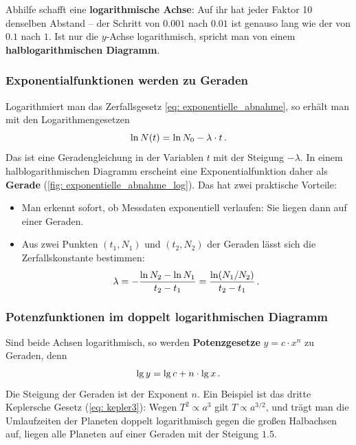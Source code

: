 Abhilfe schafft eine \textbf{logarithmische Achse}: Auf ihr hat jeder Faktor 10 denselben Abstand -- der Schritt von $\num{0.001}$ nach $\num{0.01}$ ist genauso lang wie der von $\num{0.1}$ nach $1$. Ist nur die $y$-Achse logarithmisch, spricht man von einem \textbf{halblogarithmischen Diagramm}.

\subsubsection*{Exponentialfunktionen werden zu Geraden}
Logarithmiert man das Zerfallsgesetz \cref{eq: exponentielle_abnahme}, so erhält man mit den Logarithmengesetzen
\begin{equation}
    \ln N(t) = \ln N_0 - \lambda \cdot t \,.
\end{equation}
Das ist eine Geradengleichung in der Variablen $t$ mit der Steigung $-\lambda$. In einem halblogarithmischen Diagramm erscheint eine Exponentialfunktion daher als \textbf{Gerade} (\cref{fig: exponentielle_abnahme_log}). Das hat zwei praktische Vorteile:
\begin{itemize}[itemsep=1.5pt]
    \item Man erkennt sofort, ob Messdaten exponentiell verlaufen: Sie liegen dann auf einer Geraden.
    \item Aus zwei Punkten $(t_1, N_1)$ und $(t_2, N_2)$ der Geraden lässt sich die Zerfallskonstante bestimmen:
    \begin{equation*}
        \lambda = -\frac{\ln N_2 - \ln N_1}{t_2 - t_1} = \frac{\ln(N_1/N_2)}{t_2 - t_1} \,.
    \end{equation*}
\end{itemize}

\subsubsection*{Potenzfunktionen im doppelt logarithmischen Diagramm}
Sind beide Achsen logarithmisch, so werden \textbf{Potenzgesetze} $y = c \cdot x^n$ zu Geraden, denn
\begin{equation}
    \lg y = \lg c + n \cdot \lg x \,.
\end{equation}
Die Steigung der Geraden ist der Exponent $n$. Ein Beispiel ist das dritte Keplersche Gesetz (\cref{eq: kepler3}): Wegen $T^2 \propto a^3$ gilt $T \propto a^{3/2}$, und trägt man die Umlaufzeiten der Planeten doppelt logarithmisch gegen die großen Halbachsen auf, liegen alle Planeten auf einer Geraden mit der Steigung $\num{1.5}$.

